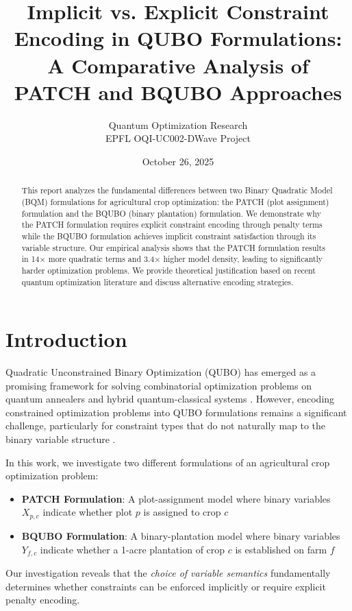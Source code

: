 \documentclass[11pt,a4paper]{article}
\title{Implicit vs. Explicit Constraint Encoding in QUBO Formulations:\\
A Comparative Analysis of PATCH and BQUBO Approaches}
\author{Quantum Optimization Research\\
EPFL OQI-UC002-DWave Project}
\date{October 26, 2025}
\begin{document}
\maketitle

\begin{abstract}
This report analyzes the fundamental differences between two Binary Quadratic Model (BQM) formulations for agricultural crop optimization: the PATCH (plot assignment) formulation and the BQUBO (binary plantation) formulation. We demonstrate why the PATCH formulation requires explicit constraint encoding through penalty terms while the BQUBO formulation achieves implicit constraint satisfaction through its variable structure. Our empirical analysis shows that the PATCH formulation results in 14× more quadratic terms and 3.4× higher model density, leading to significantly harder optimization problems. We provide theoretical justification based on recent quantum optimization literature and discuss alternative encoding strategies.
\end{abstract}

\section{Introduction}

Quadratic Unconstrained Binary Optimization (QUBO) has emerged as a promising framework for solving combinatorial optimization problems on quantum annealers and hybrid quantum-classical systems \cite{glover2019quantum}. However, encoding constrained optimization problems into QUBO formulations remains a significant challenge, particularly for constraint types that do not naturally map to the binary variable structure \cite{kanatbekova2024qubit}.

In this work, we investigate two different formulations of an agricultural crop optimization problem:

\begin{itemize}
    \item \textbf{PATCH Formulation}: A plot-assignment model where binary variables $X_{p,c}$ indicate whether plot $p$ is assigned to crop $c$
    \item \textbf{BQUBO Formulation}: A binary-plantation model where binary variables $Y_{f,c}$ indicate whether a 1-acre plantation of crop $c$ is established on farm $f$
\end{itemize}

Our investigation reveals that the \emph{choice of variable semantics} fundamentally determines whether constraints can be enforced implicitly or require explicit penalty encoding.
\end{document}
